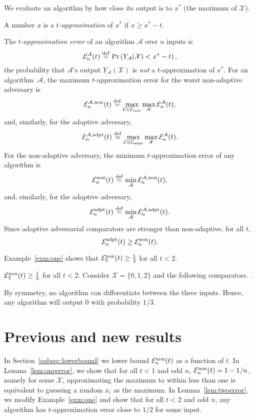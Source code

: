 \documentclass[twoside,11pt]{article}
\newcommand{\df}[1][\rm{def}]{\stackrel{#1}{=}}
\newcommand{\cC}{\mathcal{C}}
\newcommand{\cA}{\mathcal{A}}
\newcommand{\cX}{\mathcal{X}}
\newcommand{\cE}{\mathcal{E}}
\newcommand{\pr}{\text{Pr}}
\newcommand{\maxx}{x^*}
\newcommand{\nonadaptivecomp}{\cC_{\textnormal{non}}}
\newcommand{\adaptivecomp}{\cC_{\textnormal{adpt}}}
\newcommand{\pe}{\cE}
\newcommand{\adaptive}{\textnormal{adpt}}
\newcommand{\nonadaptive}{\textnormal{non}}
\begin{document}
We evaluate an algorithm by how close its output is to $\maxx$ (the
maximum of $\cX$).  
\begin{definition} A number $x$ is a
    \emph{$t$-approximation} of $\maxx$ if $x\ge\maxx-t$.
\end{definition}

\noindent The \emph{$t$-approximation error} of an algorithm $\cA$ over $n$ inputs is
\[
\pe_n^\cA(t)\df \pr\left(Y_\cA(\cX) <\maxx- t\right),
\]
the probability that $\cA$'s output $Y_\cA(\cX)$ is \emph{not} a 
$t$-approximation of $\maxx$.
For an algorithm~$\cA$, the maximum $t$-approximation error for the
worst non-adaptive adversary  is
\[
 \pe_n^{\cA,\nonadaptive}(t)\df \max_{\cC\in\nonadaptivecomp} \max_{\cX} \pe_n^{\cA}(t),
\]
and, similarly, for the adaptive adversary,
\[
 \pe_n^{\cA,\adaptive}(t)\df  \max_{\cC\in\adaptivecomp} \max_{\cX} \pe_n^{\cA}(t).
\]
For the non-adaptive adversary, the minimum $t$-approximation error of any algorithm is 
\[
 \pe_n^{\nonadaptive}(t)\df \min_{\cA} \pe_n^{\cA,\nonadaptive}(t),
\]
and, similarly, for the adaptive adversary,
\[
 \pe_n^{\adaptive}(t)\df \min_{\cA} \pe_n^{\cA,\adaptive}(t).
\]
Since adaptive adversarial comparators are stronger than non-adaptive, for all $t$,
$$\pe_n^{\adaptive}(t)\ge\pe_n^{\nonadaptive}(t).$$

Example~\ref{exm:one} shows that $\pe_3^{\nonadaptive}(t)\ge\frac13$ for all $t<2$.
\begin{example}
\label{exm:one}
$\pe_3^{\nonadaptive}(t)\ge\frac13$ for all $t<2$.
Consider $\cX=\{0,1,2\}$ and the following comparators. .
\begin{center}
\end{center}
By symmetry, no algorithm can differentiate between the three inputs.
Hence, any algorithm will output 0 with probability $1/3$.
\end{example}


\section{Previous and new results}
\label{sec:results}
In Section~\ref{subsec:lowerbound} we lower bound $\pe_n^{\nonadaptive}(t)$ as a function of $t$.
In Lemma~\ref{lem:oneerror}, we show that for all $t<1$ and odd $n$, $\pe_n^{\nonadaptive}(t)= 1-1/n$, namely for some $\cX$,
approximating the maximum to within less than one is equivalent to 
guessing a random $x_i$ as the maximum.
In Lemma~\ref{lem:twoerror}, we modify 
Example~\ref{exm:one} and show that for all $t<2$ and odd $n$, any 
algorithm has $t$-approximation error close
to $1/2$ for some input.  
\end{document}
